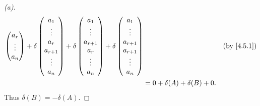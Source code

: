 \begin{proof}[(a)]
\begin{align*}
\begin{pmatrix}
			            a_r    \\
			            \vdots \\
			            a_n
		            \end{pmatrix} + \delta\begin{pmatrix}
			                                  a_1       \\
			                                  \vdots    \\
			                                  a_r       \\
			                                  a_{r + 1} \\
			                                  \vdots    \\
			                                  a_n
		                                  \end{pmatrix} + \delta\begin{pmatrix}
			                                                        a_1       \\
			                                                        \vdots    \\
			                                                        a_{r + 1} \\
			                                                        a_r       \\
			                                                        \vdots    \\
			                                                        a_n
		                                                        \end{pmatrix} + \delta\begin{pmatrix}
			                                                                              a_1       \\
			                                                                              \vdots    \\
			                                                                              a_{r + 1} \\
			                                                                              a_{r + 1} \\
			                                                                              \vdots    \\
			                                                                              a_n
		                                                                              \end{pmatrix} &  & \by{4.5.1} \\
		  & = 0 + \delta(A) + \delta(B) + 0.
	\end{align*}
	Thus \(\delta(B) = -\delta(A)\).


\end{proof}
